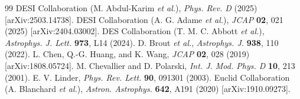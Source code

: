\documentclass[10pt,twocolumn,a4paper]{article}
\begin{document}
\begin{thebibliography}{99}
 DESI Collaboration (M. Abdul-Karim \textit{et al.}), \textit{Phys. Rev. D} (2025) [arXiv:2503.14738].
 DESI Collaboration (A. G. Adame \textit{et al.}), \textit{JCAP} \textbf{02}, 021 (2025) [arXiv:2404.03002].
 DES Collaboration (T. M. C. Abbott \textit{et al.}), \textit{Astrophys. J. Lett.} \textbf{973}, L14 (2024).
 D. Brout \textit{et al.}, \textit{Astrophys. J.} \textbf{938}, 110 (2022).
 L. Chen, Q.-G. Huang, and K. Wang, \textit{JCAP} \textbf{02}, 028 (2019) [arXiv:1808.05724].
 M. Chevallier and D. Polarski, \textit{Int. J. Mod. Phys. D} \textbf{10}, 213 (2001).
 E. V. Linder, \textit{Phys. Rev. Lett.} \textbf{90}, 091301 (2003).
 Euclid Collaboration (A. Blanchard \textit{et al.}), \textit{Astron. Astrophys.} \textbf{642}, A191 (2020) [arXiv:1910.09273].
\end{thebibliography}
\end{document}
